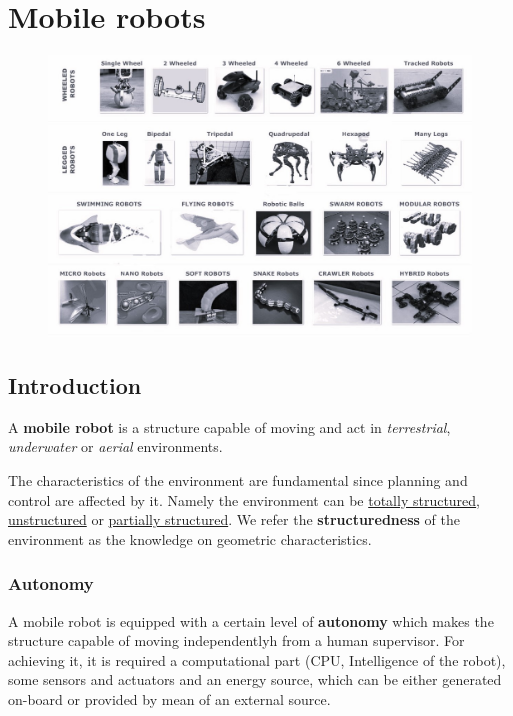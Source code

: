 \chapter{Mobile robots}
\vspace{-1cm}
\begin{figure}[h]
    \centering
    \includegraphics[scale=0.5]{img/classification.jpg}
\end{figure}
\vspace{-0.5cm}
\section{Introduction}
\begin{definition}
A \textbf{mobile robot} is a structure capable of moving and act in \textit{terrestrial}, \textit{underwater} or \textit{aerial} environments.    
\end{definition}
\noindent
The characteristics of the environment are fundamental since planning and control are affected by it. Namely the environment can be \underline{totally structured}, \underline{unstructured} or \underline{partially structured}. We refer the \textbf{structuredness} of the environment as the knowledge on geometric characteristics.
\subsection{Autonomy}
A mobile robot is equipped with a certain level of \textbf{autonomy} which makes the structure capable of moving independentlyh from a human supervisor. For achieving it, it is required a computational part (CPU, Intelligence of the robot), some sensors and actuators and an energy source, which can be either generated on-board or provided by mean of an external source.
